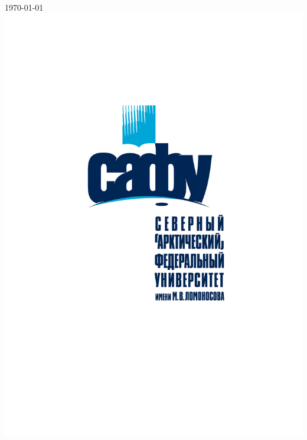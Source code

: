 \documentclass[12pt]{article}
\begin{document}
\begin{titlepage}
{\large \today}\\[2cm] 
\includegraphics[scale=0.2]{logo.pdf} 
\vfill
\end{titlepage}
\end{document}
